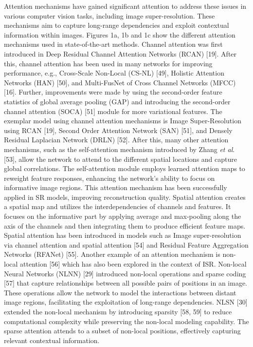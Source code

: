 \documentclass{ieeeaccess}
\begin{document}
Attention mechanisms have gained significant attention to address these issues in various computer vision tasks, including image super-resolution. These mechanisms aim to capture long-range dependencies and exploit contextual information within images. Figures 1a, 1b and 1c show the different attention mechanisms used in state-of-the-art methods. Channel attention was first introduced in Deep Residual Channel Attention Networks (RCAN) [19]. After this, channel attention has been used in many networks for improving performance, e.g., Cross-Scale Non-Local (CS-NL) [49], Holistic Attention Networks (HAN) [50], and Multi-FusNet of Cross Channel Networks (MFCC) [16]. Further, improvements were made by using the second-order feature statistics of global average pooling (GAP) and introducing the second-order channel attention (SOCA) [51] module for more variational features. The exemplar model using channel attention mechanisms is Image Super-Resolution using RCAN [19], Second Order Attention Network (SAN) [51], and Densely Residual Laplacian Network (DRLN) [52]. After this, many other attention mechanisms, such as the self-attention mechanism introduced by Zhang \textit{et al}. [53], allow the network to attend to the different spatial locations and capture global correlations. The self-attention module employs learned attention maps to reweight feature responses, enhancing the network's ability to focus on informative image regions. This attention mechanism has been successfully applied in SR models, improving reconstruction quality. Spatial attention creates a spatial map and utilizes the interdependencies of channels and features. It focuses on the informative part by applying average and max-pooling along the axis of the channels and then integrating them to produce efficient feature maps. Spatial attention has been introduced in models such as Image super-resolution via channel attention and spatial attention [54] and Residual Feature Aggregation Networks (RFANet) [55]. Another example of an attention mechanism is non-local attention [56] which has also been explored in the context of ISR. Non-local Neural Networks (NLNN) [29] introduced non-local operations and sparse coding [57] that capture relationships between all possible pairs of positions in an image. These operations allow the network to model the interactions between distant image regions, facilitating the exploitation of long-range dependencies. NLSN [30] extended the non-local mechanism by introducing sparsity [58, 59] to reduce computational complexity while preserving the non-local modeling capability. The sparse attention attends to a subset of non-local positions, effectively capturing relevant contextual information. 
\end{document}
